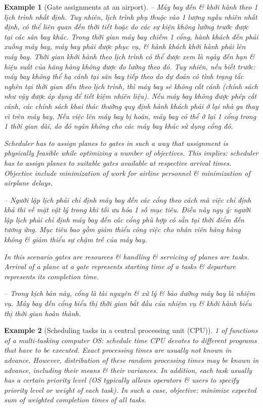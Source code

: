 \documentclass{article}
\newtheorem{example}{Example}
\begin{document}
\begin{itemize}
\begin{itemize}
\begin{example}[Gate assignments at an airport]
            -- Máy bay đến \& khởi hành theo 1 lịch trình nhất định. Tuy nhiên, lịch trình phụ thuộc vào 1 lượng ngẫu nhiên nhất định, có thể liên quan đến thời tiết hoặc do các sự kiện không lường trước được tại các sân bay khác. Trong thời gian máy bay chiếm 1 cổng, hành khách đến phải xuống máy bay, máy bay phải được phục vụ, \& hành khách khởi hành phải lên máy bay. Thời gian khởi hành theo lịch trình có thể được xem là ngày đến hạn \& hiệu suất của hãng hàng không được đo lường theo đó. Tuy nhiên, nếu biết trước: máy bay không thể hạ cánh tại sân bay tiếp theo do dự đoán có tình trạng tắc nghẽn tại thời gian đến theo lịch trình, thì máy bay sẽ không cất cánh (chính sách như vậy được áp dụng để tiết kiệm nhiên liệu). Nếu máy bay không được phép cất cánh, các chính sách khai thác thường quy định hành khách phải ở lại nhà ga thay vì trên máy bay. Nếu việc lên máy bay bị hoãn, máy bay có thể ở lại 1 cổng trong 1 thời gian dài, do đó ngăn không cho các máy bay khác sử dụng cổng đó.

            Scheduler has to assign planes to gates in such a way that assignment is physically feasible while optimizing a number of objectives. This implies: scheduler has to assign planes to suitable gates available at respective arrival times. Objective include minimization of work for airline personnel \& minimization of airplane delays.

            -- Người lập lịch phải chỉ định máy bay đến các cổng theo cách mà việc chỉ định khả thi về mặt vật lý trong khi tối ưu hóa 1 số mục tiêu. Điều này ngụ ý: người lập lịch phải chỉ định máy bay đến các cổng phù hợp có sẵn tại thời điểm đến tương ứng. Mục tiêu bao gồm giảm thiểu công việc cho nhân viên hãng hàng không \& giảm thiểu sự chậm trễ của máy bay.

            In this scenario gates are resources \& handling \& servicing of planes are tasks. Arrival of a plane at a gate represents starting time of a tasks \& departure represents its completion time.

            -- Trong kịch bản này, cổng là tài nguyên \& xử lý \& bảo dưỡng máy bay là nhiệm vụ. Máy bay đến cổng biểu thị thời gian bắt đầu của nhiệm vụ \& khởi hành biểu thị thời gian hoàn thành.
        \end{example}

        \begin{example}[Scheduling tasks in a central processing unit (CPU)]
            1 of functions of a multi-tasking computer OS: schedule time CPU devotes to different programs that have to be executed. Exact processing times are usually not known in advance. However, distribution of these random processing times may be known in advance, including their means \& their variances. In addition, each task usually has a certain priority level (OS typically allows operators \& users to specify priority level or weight of each task). In such a case, objective: minimize expected sum of weighted completion times of all tasks.


\end{example}
\end{itemize}
\end{itemize}
\end{document}
